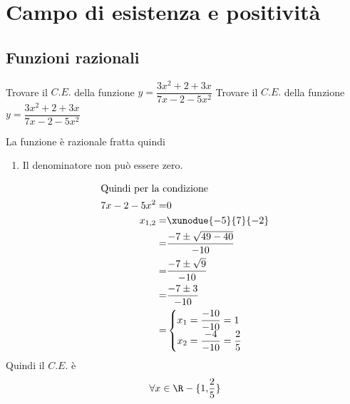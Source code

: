 \chapter{Campo di esistenza e positività}
\tcbstartrecording
\section{Funzioni razionali}
\begin{exercise}
	Trovare il $C.E.$ della funzione $y=\dfrac{3x^2+2+3x}{7x-2-5x^2} $
	\tcblower
	Trovare il $C.E.$ della funzione $y=\dfrac{3x^2+2+3x}{7x-2-5x^2} $
	
	La funzione è razionale fratta quindi
		\begin{enumerate}
		\item Il denominatore non può essere zero.
	\end{enumerate}
\begin{align*}
\intertext{Quindi per la condizione}
7x-2-5x^2=&0\\
x_{1,2}=&\xunodue{-5}{7}{-2}\\
=&\dfrac{-7\pm\sqrt{49-40}}{-10}\\
=&\dfrac{-7\pm \sqrt{9}}{-10}\\
=&\dfrac{-7\pm 3}{-10}\\
=&\begin{cases}
x_1=\dfrac{-10}{-10}=1\\
x_2=\dfrac{-4}{-10}=\dfrac{2}{5}
\end{cases}\\
\end{align*}
Quindi il $C.E.$ è 
\begin{align*}
\forall x\in\R-\lbrace 1,&\dfrac{2}{5}\rbrace\\
\end{align*}
\end{exercise}
